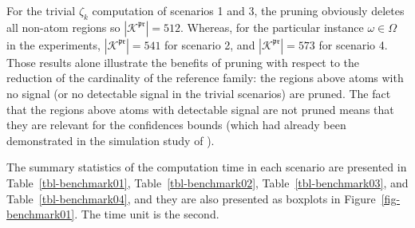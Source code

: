 \documentclass[
  11pt,
  a4paper,
]{article}
\theoremstyle{plain}
\theoremstyle{plain}
\theoremstyle{definition}
\theoremstyle{plain}
\theoremstyle{definition}
\theoremstyle{remark}
\begin{document}
For the trivial \(\zeta_k\) computation of scenarios 1 and 3, the
pruning obviously deletes all non-atom regions so
\(|\mathcal{K}^{\mathfrak{pr}}|=512\). Whereas, for the particular
instance \(\omega\in\Omega\) in the experiments,
\(|\mathcal{K}^{\mathfrak{pr}}|=541\) for scenario 2, and
\(|\mathcal{K}^{\mathfrak{pr}}|=573\) for scenario 4. Those results
alone illustrate the benefits of pruning with respect to the reduction
of the cardinality of the reference family: the regions above atoms with
no signal (or no detectable signal in the trivial scenarios) are pruned.
The fact that the regions above atoms with detectable signal are not
pruned means that they are relevant for the confidences bounds (which
had already been demonstrated in the simulation study of
\citet{MR4178188}).

The summary statistics of the computation time in each scenario are
presented in Table~\ref{tbl-benchmark01}, Table~\ref{tbl-benchmark02},
Table~\ref{tbl-benchmark03}, and Table~\ref{tbl-benchmark04}, and they
are also presented as boxplots in Figure~\ref{fig-benchmark01}. The time
unit is the second.
\end{document}
